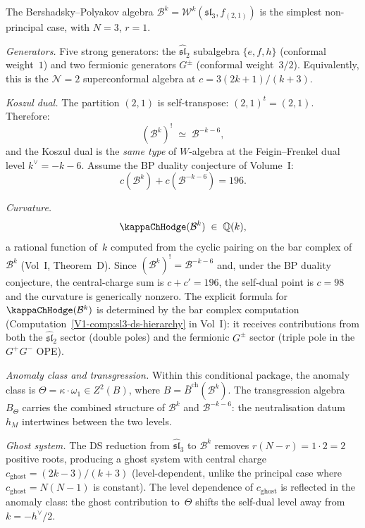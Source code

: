 \begin{computation}
The Bershadsky--Polyakov algebra
$\mathcal B^k=\mathcal W^k(\mathfrak{sl}_3,f_{(2,1)})$
is the simplest non-principal case, with $N=3$, $r=1$.

\emph{Generators.}
Five strong generators: the $\widehat{\mathfrak{sl}}_2$
subalgebra $\{e,f,h\}$ (conformal weight~$1$) and two
fermionic generators $G^\pm$ (conformal weight~$3/2$).
Equivalently, this is the $\mathcal N=2$ superconformal
algebra at $c=3(2k{+}1)/(k{+}3)$.

\emph{Koszul dual.}
The partition $(2,1)$ is self-transpose:
$(2,1)^t=(2,1)$. Therefore:
\[
(\mathcal B^k)^!
\;\simeq\;
\mathcal B^{-k-6},
\]
and the Koszul dual is the \emph{same type} of $W$-algebra
at the Feigin--Frenkel dual level $k^\vee=-k-6$.
Assume the BP duality conjecture of Volume~I:
\[
c(\mathcal B^k)+c(\mathcal B^{-k-6})=196.
\]

\emph{Curvature.}
\[
\kappaChHodge(\mathcal B^k)
\;\in\;\mathbb Q(k),
\]
a rational function of~$k$ computed from the cyclic pairing
on the bar complex of $\mathcal B^k$ (Vol~I, Theorem~D).
Since $(\mathcal B^k)^!=\mathcal B^{-k-6}$ and, under the BP
duality conjecture, the central-charge sum is $c+c'=196$, the
self-dual point is $c=98$ and the curvature is generically
nonzero.
The explicit formula for $\kappaChHodge(\mathcal B^k)$ is determined
by the bar complex computation
(Computation~\ref*{V1-comp:sl3-ds-hierarchy} in Vol~I):
it receives contributions from both the
$\widehat{\mathfrak{sl}}_2$ sector (double poles) and the
fermionic $G^\pm$ sector (triple pole in the $G^+G^-$ OPE).

\emph{Anomaly class and transgression.}
Within this conditional package, the anomaly class is
$\Theta=\kappa\cdot\omega_1\in Z^2(B)$,
where $B=\bar B^{\mathrm{ch}}(\mathcal B^k)$. The
transgression algebra $B_\Theta$ carries the combined
structure of $\mathcal B^k$ and $\mathcal B^{-k-6}$:
the neutralisation datum $h_M$ intertwines between the two
levels.

\emph{Ghost system.}
The DS reduction from $\widehat{\mathfrak{sl}}_3$ to
$\mathcal B^k$ removes $r(N{-}r)=1\cdot 2=2$ positive roots,
producing a ghost system with central charge
$c_{\mathrm{ghost}}=(2k{-}3)/(k{+}3)$
(level-dependent, unlike the principal case where
$c_{\mathrm{ghost}}=N(N{-}1)$ is constant). The level
dependence of $c_{\mathrm{ghost}}$ is reflected in the
anomaly class: the ghost contribution to~$\Theta$ shifts
the self-dual level away from $k=-h^\vee/2$.


\end{computation}
